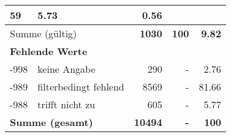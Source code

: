 \begin{longtable}{lXrrr}
       \num{59} &
       \num[round-mode=places,round-precision=2]{5,73} &
         \num[round-mode=places,round-precision=2]{0,56} \\
     \midrule
     \multicolumn{2}{l}{Summe (gültig)} &
       \textbf{\num{1030}} &
     \textbf{100} &
       \textbf{\num[round-mode=places,round-precision=2]{9,82}} \\
     \multicolumn{5}{l}{\textbf{Fehlende Werte}}\\
       -998 &
       keine Angabe &
         \num{290} &
        - &
         \num[round-mode=places,round-precision=2]{2,76} \\
       -989 &
       filterbedingt fehlend &
         \num{8569} &
        - &
         \num[round-mode=places,round-precision=2]{81,66} \\
       -988 &
       trifft nicht zu &
         \num{605} &
        - &
         \num[round-mode=places,round-precision=2]{5,77} \\
     \midrule
     \multicolumn{2}{l}{\textbf{Summe (gesamt)}} &
          \textbf{\num{10494}} &
        \textbf{-} &
        \textbf{100} \\
     \bottomrule
     \end{longtable}
     
